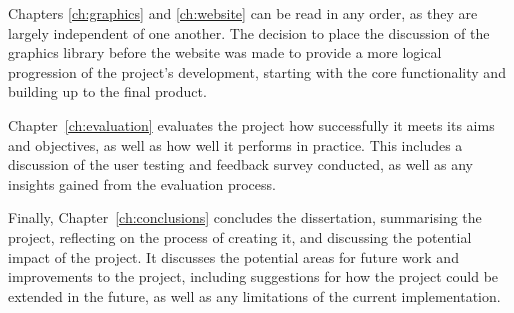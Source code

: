 \documentclass[../main.tex]{subfiles}
\begin{document}
        Chapters \ref{ch:graphics} and \ref{ch:website} can be read in any order, as
            they are largely independent of one another.
        The decision to place the discussion of the graphics library before the website
            was made to provide a more logical progression of the project's development,
            starting with the core functionality and building up to the final product.

        Chapter~\ref{ch:evaluation} evaluates the project how successfully it meets its
            aims and objectives, as well as how well it performs in practice.
        This includes a discussion of the user testing and feedback survey conducted,
            as well as any insights gained from the evaluation process.

        Finally, Chapter~\ref{ch:conclusions} concludes the dissertation, summarising
            the project, reflecting on the process of creating it, and discussing the
            potential impact of the project.
        It discusses the potential areas for future work and improvements to the
            project, including suggestions for how the project could be extended in the
            future, as well as any limitations of the current implementation.
\end{document}
